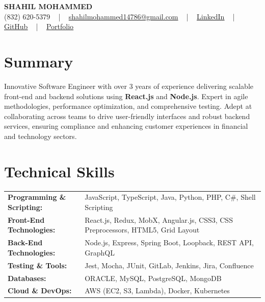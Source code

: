 \documentclass[letterpaper,11pt]{article}
\begin{document}
\begin{center}
    {\fontsize{14pt}{12pt}\selectfont \textbf{\MakeUppercase{Shahil Mohammed}}}\\ \vspace{2pt}
    \fontsize{10pt}{12pt}\selectfont (832) 620-5379 ~ | ~ \href{mailto:shahilmohammed14786@gmail.com}{shahilmohammed14786@gmail.com} ~ | ~  
    \href{https://www.linkedin.com/in/shahil-mohammed-9652931a1/}{\color{blue}\underline{LinkedIn}}  ~ | ~ 
    \href{https://github.com/freakbeast14}{\color{blue}\underline{GitHub}} ~ | ~ 
    \href{https://shahil-mohammed.netlify.app/}{\color{blue}\underline{Portfolio}}
    \vspace{-8pt}
\end{center}

\section{Summary}
\fontsize{9pt}{10pt}\selectfont
Innovative Software Engineer with over 3 years of experience delivering scalable front-end and backend solutions using \textbf{React.js} and \textbf{Node.js}. Expert in agile methodologies, performance optimization, and comprehensive testing. Adept at collaborating across teams to drive user-friendly interfaces and robust backend services, ensuring compliance and enhancing customer experiences in financial and technology sectors.
 \vspace{-5pt}
 
\section{Technical Skills}
        \vspace{-14pt}
        \begin{table}[h]
            \fontsize{9pt}{10pt}\selectfont
            \begin{tabular}{p{0.3\linewidth} p{0.7\linewidth}}
                \textbf{Programming \& Scripting:} & JavaScript, TypeScript, Java, Python, PHP, C\#, Shell Scripting \\
                \textbf{Front-End Technologies:} & React.js, Redux, MobX, Angular.js, CSS3, CSS Preprocessors, HTML5, Grid Layout \\
                \textbf{Back-End Technologies:} & Node.js, Express, Spring Boot, Loopback, REST API, GraphQL \\
                \textbf{Testing \& Tools:} & Jest, Mocha, JUnit, GitLab, Jenkins, Jira, Confluence \\
                \textbf{Databases:} & ORACLE, MySQL, PostgreSQL, MongoDB \\
                \textbf{Cloud \& DevOps:} & AWS (EC2, S3, Lambda), Docker, Kubernetes \\
            \end{tabular}
        \end{table}
 \vspace{-15pt}
 
\end{document}
